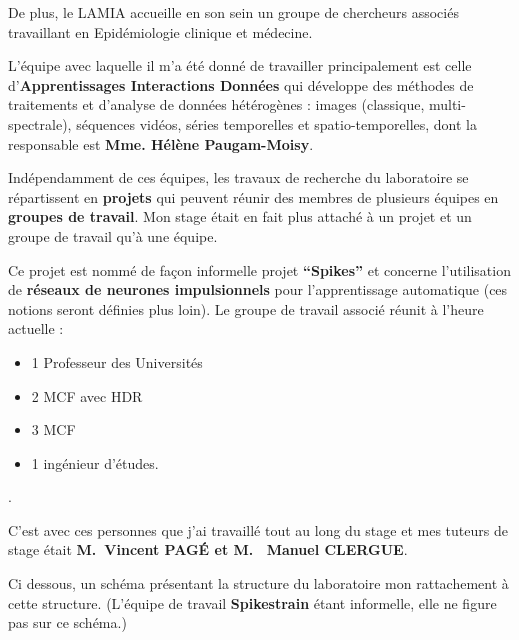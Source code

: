 De plus, le LAMIA accueille en son sein un groupe de chercheurs associés
travaillant en Epidémiologie clinique et médecine.

L'équipe avec laquelle il m'a été donné de travailler principalement est
celle d'\textbf{Apprentissages Interactions Données} qui développe des
méthodes de traitements et d'analyse de données hétérogènes : images
(classique, multi-spectrale), séquences vidéos, séries temporelles et
spatio-temporelles, dont la responsable est \textbf{Mme. Hélène
Paugam-Moisy}.

Indépendamment de ces équipes, les travaux de recherche du laboratoire
se répartissent en \textbf{projets} qui peuvent réunir des membres de
plusieurs équipes en \textbf{groupes de travail}. Mon stage était en
fait plus attaché à un projet et un groupe de travail qu'à une équipe.

Ce projet est nommé de façon informelle projet \textbf{``Spikes''} et
concerne l'utilisation de \textbf{réseaux de neurones impulsionnels}
pour l'apprentissage automatique (ces notions seront définies plus
loin). Le groupe de travail associé réunit à l'heure actuelle :

\begin{itemize}
\tightlist
\item
  1 Professeur des Universités
\item
  2 MCF avec HDR
\item
  3 MCF
\item
  1 ingénieur d'études.
\end{itemize}.

C'est avec ces personnes que j'ai travaillé tout au long du stage et mes
tuteurs de stage était \textbf{M.~Vincent PAGÉ et M. ~Manuel CLERGUE}.

Ci dessous, un schéma présentant la structure du laboratoire mon
rattachement à cette structure. (L'équipe de travail \textbf{Spikestrain}
étant informelle, elle ne figure pas sur ce schéma.)

